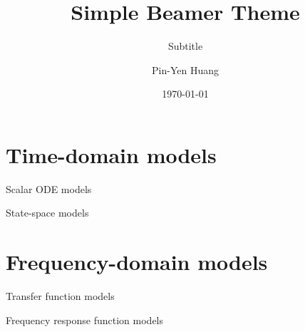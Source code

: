 \documentclass[aspectratio=169,xcolor=dvipsnames]{beamer}
\title[short title]{Simple Beamer Theme}
\subtitle{Subtitle}
\author[Pin-Yen] {Pin-Yen Huang}
\institute[NTU] %
{
    Department of Computer Science and Information Engineering \\
    National Taiwan University 
    \vskip 3pt
}
\date{\today} %
\begin{document}
\begin{frame}
\maketitle
\end{frame}

\section{Time-domain models}

\begin{frame}{Scalar ODE models}
    
\end{frame}

\begin{frame}{State-space models}
    
\end{frame}

\section{Frequency-domain models}

\begin{frame}{Transfer function models}

\end{frame}

\begin{frame}{Frequency response function models}

\end{frame}

\end{document}
